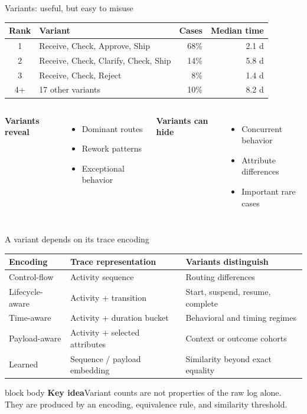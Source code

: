 \documentclass[aspectratio=169,11pt]{beamer}
\newcommand{\keyidea}[1]{%
  \begin{beamercolorbox}[rounded=true,sep=0.65em]{block body}
    \textbf{\color{Teal}Key idea}\quad #1
  \end{beamercolorbox}
}
\begin{document}
\begin{frame}{Variants: useful, but easy to misuse}
  \small
  \begin{tabular}{@{}clrr@{}}
    \toprule
    Rank & Variant & Cases & Median time\\
    \midrule
    1 & Receive, Check, Approve, Ship & 68\% & 2.1 d\\
    2 & Receive, Check, Clarify, Check, Ship & 14\% & 5.8 d\\
    3 & Receive, Check, Reject & 8\% & 1.4 d\\
    4+ & 17 other variants & 10\% & 8.2 d\\
    \bottomrule
  \end{tabular}
  \vspace{0.45cm}
  \begin{columns}[T,onlytextwidth]
      \textbf{Variants reveal}
      \begin{itemize}
        \item Dominant routes
        \item Rework patterns
        \item Exceptional behavior
      \end{itemize}
      \textbf{Variants can hide}
      \begin{itemize}
        \item Concurrent behavior
        \item Attribute differences
        \item Important rare cases
      \end{itemize}
  \end{columns}
\end{frame}

\begin{frame}{A variant depends on its trace encoding}
  \small
  \begin{tabular}{@{}
    >{\raggedright\arraybackslash}p{}
    >{\raggedright\arraybackslash}p{}
    >{\raggedright\arraybackslash}p{}@{}}
    \toprule
    Encoding & Trace representation & Variants distinguish\\
    \midrule
    Control-flow & Activity sequence & Routing differences\\
    Lifecycle-aware & Activity + transition & Start, suspend, resume, complete\\
    Time-aware & Activity + duration bucket & Behavioral and timing regimes\\
    Payload-aware & Activity + selected attributes & Context or outcome cohorts\\
    Learned & Sequence / payload embedding & Similarity beyond exact equality\\
    \bottomrule
  \end{tabular}
  \vspace{0.4cm}
  \keyidea{Variant counts are not properties of the raw log alone. They are
  produced by an encoding, equivalence rule, and similarity threshold.}
\end{frame}
\end{document}
